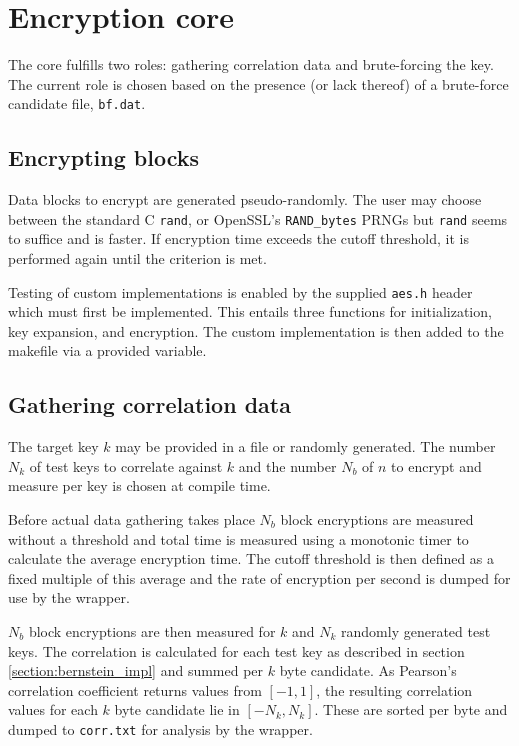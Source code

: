 \documentclass[thesis=B,english]{FITthesis}[2019/03/06]
\begin{document}
\section{Encryption core}
The core fulfills two roles: gathering correlation data and brute-forcing the key.
The current role is chosen based on the presence (or lack thereof) of a brute-force candidate file, \verb'bf.dat'.

\subsection{Encrypting blocks}
Data blocks to encrypt are generated pseudo-randomly.
The user may choose between the standard C \verb'rand', or OpenSSL's \verb'RAND_bytes' PRNGs but \verb'rand' seems to suffice and is faster.
If encryption time exceeds the cutoff threshold, it is performed again until the criterion is met.

Testing of custom implementations is enabled by the supplied \verb'aes.h' header which must first be implemented.
This entails three functions for initialization, key expansion, and encryption.
The custom implementation is then added to the makefile via a provided variable.

\subsection{Gathering correlation data}
\label{section:gathering_corr_data}
The target key $k$ may be provided in a file or randomly generated.
The number $N_k$ of test keys to correlate against $k$ and the number $N_b$ of $n$ to encrypt and measure per key is chosen at compile time.

Before actual data gathering takes place $N_b$ block encryptions are measured without a threshold and total time is measured using a monotonic timer to calculate the average encryption time.
The cutoff threshold is then defined as a fixed multiple of this average and the rate of encryption per second is dumped for use by the wrapper.

$N_b$ block encryptions are then measured for $k$ and $N_k$ randomly generated test keys.
The correlation is calculated for each test key as described in section \ref{section:bernstein_impl} and summed per $k$ byte candidate.
As Pearson's correlation coefficient returns values from $[-1, 1]$, the resulting correlation values for each $k$ byte candidate lie in $[-N_k, N_k]$.
These are sorted per byte and dumped to \verb'corr.txt' for analysis by the wrapper.
\end{document}
